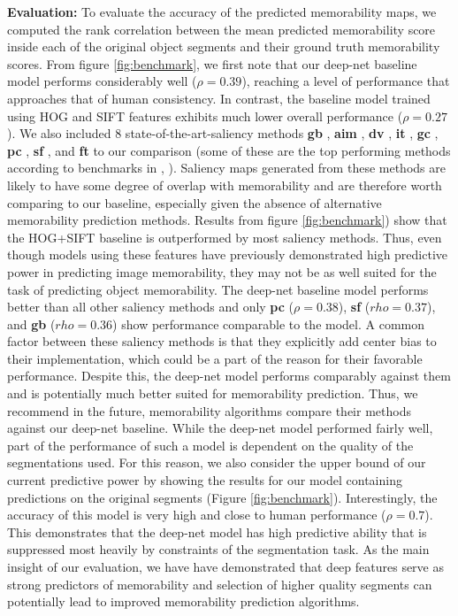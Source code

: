 \textbf{Evaluation: } To evaluate the accuracy of the predicted memorability maps, we computed the rank correlation between the mean predicted memorability score inside each of the original object segments and their ground truth memorability scores. From figure \ref{fig:benchmark}, we first note that our deep-net baseline model performs considerably well ($\rho = 0.39$), reaching a level of performance that approaches  that of human consistency. In contrast, the baseline model trained using HOG and SIFT features exhibits much lower overall performance ($\rho = 0.27$). We also included $8$ state-of-the-art-saliency methods \textbf{gb} \cite{gb}, \textbf{aim} \cite{aim}, \textbf{dv} \cite{dv}, \textbf{it} \cite{it}, \textbf{gc} \cite{gc}, \textbf{pc} \cite{pc}, \textbf{sf} \cite{sf}, and \textbf{ft} \cite{ft} to our comparison (some of these are the top performing methods according to benchmarks in \cite{borji13}, \cite{borji12}). Saliency maps generated from these methods are likely to have some degree of overlap with memorability and are therefore worth comparing to our baseline, especially given the absence of alternative memorability prediction methods. Results from figure \ref{fig:benchmark}) show that the HOG+SIFT baseline is outperformed by most saliency methods. Thus, even though models using these features have previously demonstrated high predictive power in predicting image memorability, they may not be as well  suited for the task of predicting object memorability. The deep-net baseline model performs better than all other saliency methods and only \textbf{pc} ($\rho=0.38$), \textbf{sf} ($rho=0.37$), and \textbf{gb} ($rho=0.36$) show performance comparable to the model. A common factor between these saliency methods is that they explicitly add center bias to their implementation, which could be a  part of the reason for their favorable performance. Despite this, the deep-net model performs comparably against them and is potentially much better suited for memorability prediction. Thus, we recommend in the future, memorability algorithms compare their methods against our deep-net baseline. While the deep-net model performed fairly well, part of the performance of such a model is dependent on the quality of the segmentations used. For this reason, we also consider the upper bound of our current predictive power by showing the results for our model containing predictions on the original segments (Figure \ref{fig:benchmark}). Interestingly, the accuracy of this model is very high and close to human performance ($\rho = 0.7$). This demonstrates that the deep-net model has high predictive ability that is suppressed most heavily by constraints of the segmentation task. As the main insight of our evaluation, we have have demonstrated that deep features serve as strong predictors of memorability and selection of higher quality segments can potentially lead to improved memorability prediction algorithms.

